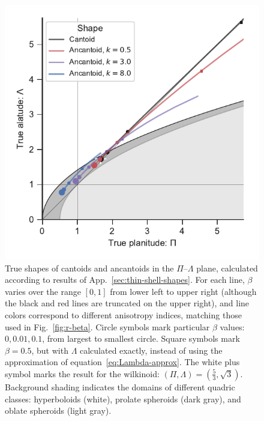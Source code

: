 \begin{figure}
  \centering
  \includegraphics[width=\linewidth]{figs/ancantoid-Pi-lambda-true}
  \caption{True shapes of cantoids and ancantoids in the
    \(\Pi\)--\(\Lambda\) plane, calculated according to results of
    App.~\ref{sec:thin-shell-shapes}.  For each line, \(\beta\) varies
    over the range \([0, 1]\) from lower left to upper right (although
    the black and red lines are truncated on the upper right), and
    line colors correspond to different anisotropy indices, matching
    those used in Fig.~\ref{fig:r-beta}. Circle symbols mark
    particular \(\beta\) values: \(0, 0.01, 0.1\), from largest to
    smallest circle.  Square symbols mark \(\beta = 0.5\), but with
    \(\Lambda\) calculated exactly, instead of using the approximation of
    equation~\eqref{eq:Lambda-approx}.  The white plus symbol marks
    the result for the wilkinoid:
    \((\Pi, \Lambda) = (\frac53, \sqrt{3})\).  Background shading indicates
    the domains of different quadric classes: hyperboloids (white),
    prolate spheroids (dark gray), and oblate spheroids (light gray).}
  \label{fig:ancantoid-Pi-lambda-true}
\end{figure}

